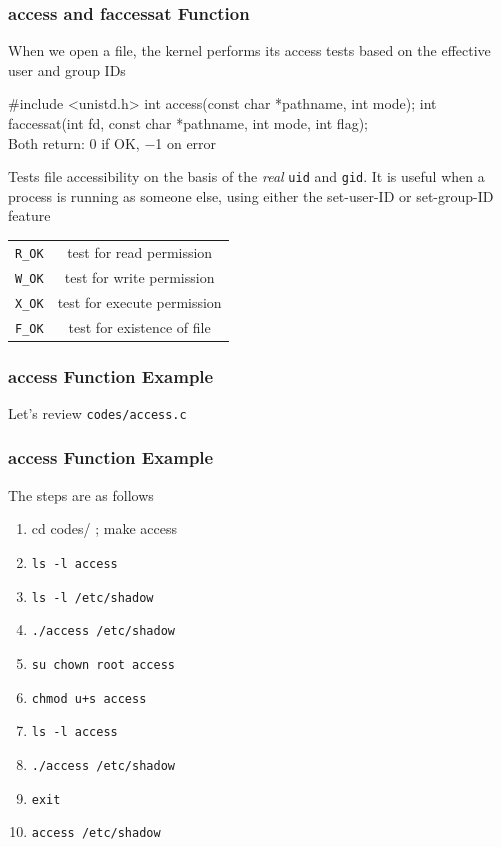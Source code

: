 \documentclass[newPxFont,sthlmFooter,nooffset]{beamer}
\begin{document}
\begin{frame}[containsverbatim,t]
  \frametitle{access and faccessat Function}
When we open a file, the kernel performs its access tests based on the effective user and group IDs

  \begin{codedef}
 #include <unistd.h>
int access(const char *pathname, int mode);
int faccessat(int fd, const char *pathname, int mode, int flag);
\\ Both return: 0 if OK, −1 on error
  \end{codedef}
\bigskip
Tests file accessibility on the basis of the {\em real} \texttt{uid} and \texttt{gid}. It is useful when a process is running as someone else, using either the set-user-ID or set-group-ID feature

\begin{center}
  \begin{tabular}{c | c}
    \texttt{R\_OK} & test for read permission \\
    \texttt{W\_OK} & test for write permission \\
    \texttt{X\_OK} & test for execute permission \\
    \texttt{F\_OK} & test for existence of file \\
  \end{tabular}
\end{center}

\end{frame}



\begin{frame}[containsverbatim,t]
  \frametitle{access Function Example}
Let's review \texttt{codes/access.c}


\end{frame}



\begin{frame}[containsverbatim,t]
  \frametitle{access Function Example}
The steps are as follows
  \begin{enumerate}[ ]
  \item cd codes/ ; make access
  \item \texttt{ls -l access}
  \item \texttt{ls -l /etc/shadow}
  \item \texttt{./access /etc/shadow}
  \item \texttt{su chown root access}
  \item \texttt{chmod u+s access}
  \item \texttt{ls -l access}
  \item \texttt{./access /etc/shadow}
  \item \texttt{exit}
  \item \texttt{access /etc/shadow}
  \end{enumerate}
\end{frame}
\end{document}
